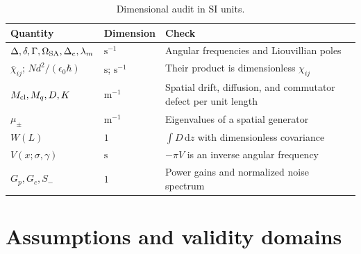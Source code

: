 \documentclass[11pt,a4paper]{article}
\newcommand{\dd}{\mathrm d}
\newcommand{\chibar}{\bar\chi}
\begin{document}
\begin{table}[ht]
\centering
\caption{Dimensional audit in SI units.}
\label{tab:dimension-audit}
\small
\begin{tabularx}{\textwidth}{L{4.1cm}L{3.0cm}Y}
\toprule
Quantity & Dimension & Check\\
\midrule
$\Delta,\delta,\Gamma,\Omega_{\rm SA},\Delta_e,\lambda_m$ &
$\mathrm{s}^{-1}$ & Angular frequencies and Liouvillian poles\\
$\chibar_{ij}$; $Nd^2/(\epsilon_0\hbar)$ &
$\mathrm{s}$; $\mathrm{s}^{-1}$ & Their product is dimensionless $\chi_{ij}$\\
$M_{\rm cl},M_q,D,K$ & $\mathrm{m}^{-1}$ & Spatial drift, diffusion, and
commutator defect per unit length\\
$\mu_\pm$ & $\mathrm{m}^{-1}$ & Eigenvalues of a spatial generator\\
$W(L)$ & $1$ & $\int D\,\dd z$ with dimensionless covariance\\
$V(x;\sigma,\gamma)$ & $\mathrm{s}$ & $-\pi V$ is an inverse angular frequency\\
$G_p,G_c,S_-$ & $1$ & Power gains and normalized noise spectrum\\
\bottomrule
\end{tabularx}
\end{table}

\section{Assumptions and validity domains}
\label{app:assumptions}
\end{document}

